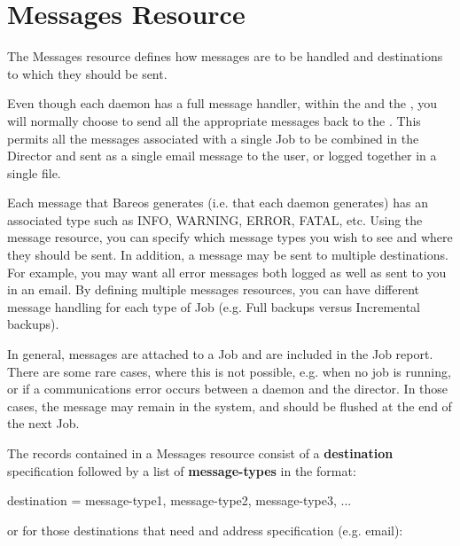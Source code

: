 
\chapter{Messages Resource}
\label{MessagesChapter}
\label{ResourceMessages}

The Messages resource defines how messages are to be handled and destinations
to which they should be sent.

Even though each daemon has a full message handler, within the \bareosFd and
the \bareosSd, you will normally choose to send all the appropriate
messages back to the \bareosDir.  This permits all the messages associated with
a single Job to be combined in the Director and sent as a single email message
to the user, or logged together in a single file.

Each message that Bareos generates (i.e. that each daemon generates) has an
associated type such as INFO, WARNING, ERROR, FATAL, etc. Using the message
resource, you can specify which message types you wish to see and where they
should be sent. In addition, a message may be sent to multiple destinations.
For example, you may want all error messages both logged as well as sent to
you in an email. By defining multiple messages resources, you can have
different message handling for each type of Job (e.g. Full backups versus
Incremental backups).

In general, messages are attached to a Job and are included in the Job report.
There are some rare cases, where this is not possible, e.g. when no job is
running, or if a communications error occurs between a daemon and the
director. In those cases, the message may remain in the system, and should be
flushed at the end of the next Job.

The records contained in a Messages resource consist of a {\bf destination}
specification followed by a list of {\bf message-types} in the format:

\begin{description}
\item [destination = message-type1, message-type2, message-type3, ...  ]
\end{description}

or for those destinations that need and address specification (e.g. email):

